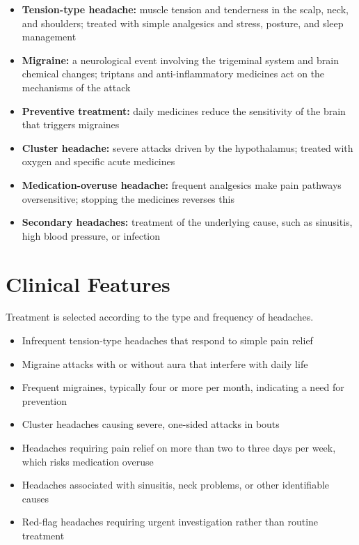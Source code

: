 \begin{itemize}
    \item \textbf{Tension-type headache:} muscle tension and tenderness in the scalp, neck, and shoulders; treated with simple analgesics and stress, posture, and sleep management
    \item \textbf{Migraine:} a neurological event involving the trigeminal system and brain chemical changes; triptans and anti-inflammatory medicines act on the mechanisms of the attack
    \item \textbf{Preventive treatment:} daily medicines reduce the sensitivity of the brain that triggers migraines
    \item \textbf{Cluster headache:} severe attacks driven by the hypothalamus; treated with oxygen and specific acute medicines
    \item \textbf{Medication-overuse headache:} frequent analgesics make pain pathways oversensitive; stopping the medicines reverses this
    \item \textbf{Secondary headaches:} treatment of the underlying cause, such as sinusitis, high blood pressure, or infection
\end{itemize}

\section*{Clinical Features}
Treatment is selected according to the type and frequency of headaches.

\begin{itemize}
    \item Infrequent tension-type headaches that respond to simple pain relief
    \item Migraine attacks with or without aura that interfere with daily life
    \item Frequent migraines, typically four or more per month, indicating a need for prevention
    \item Cluster headaches causing severe, one-sided attacks in bouts
    \item Headaches requiring pain relief on more than two to three days per week, which risks medication overuse
    \item Headaches associated with sinusitis, neck problems, or other identifiable causes
    \item Red-flag headaches requiring urgent investigation rather than routine treatment
\end{itemize}

